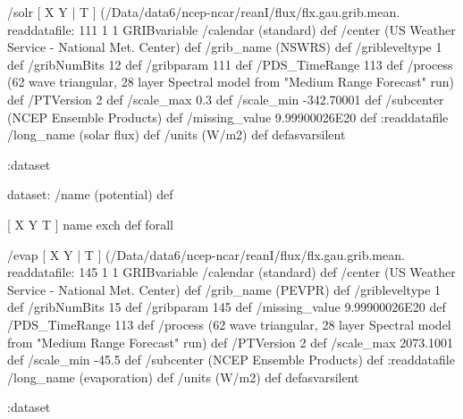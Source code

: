 \begin{ingrid}
   /solr { [ X Y | T ] (/Data/data6/ncep-ncar/reanI/flux/flx.gau.grib.mean.%
   readdatafile:
   111 1 1 GRIBvariable
   /calendar (standard) def
   /center (US Weather Service - National Met. Center) def
   /grib_name (NSWRS) def
   /gribleveltype 1 def
   /gribNumBits 12 def
   /gribparam 111 def
   /PDS_TimeRange 113 def
   /process (62 wave triangular, 28 layer Spectral model from "Medium Range Forecast" run) def
   /PTVersion 2 def
   /scale_max 0.3 def
   /scale_min -342.70001 def
   /subcenter (NCEP Ensemble Products) def
   /missing_value 9.99900026E20 def
   :readdatafile
   /long_name (solar flux) def
   /units (W/m2) def
   } defasvarsilent

  :dataset

  dataset: /name (potential) def

   [ X Y T ] { name exch def } forall

   /evap { [ X Y | T ] (/Data/data6/ncep-ncar/reanI/flux/flx.gau.grib.mean.%
   readdatafile:
   145 1 1 GRIBvariable
   /calendar (standard) def
   /center (US Weather Service - National Met. Center) def
   /grib_name (PEVPR) def
   /gribleveltype 1 def
   /gribNumBits 15 def
   /gribparam 145 def
   /missing_value 9.99900026E20 def
   /PDS_TimeRange 113 def
   /process (62 wave triangular, 28 layer Spectral model from "Medium Range Forecast" run) def
   /PTVersion 2 def
   /scale_max 2073.1001 def
   /scale_min -45.5 def
   /subcenter (NCEP Ensemble Products) def
   :readdatafile
   /long_name (evaporation) def
   /units (W/m2) def
   } defasvarsilent

  :dataset

\end{ingrid}

